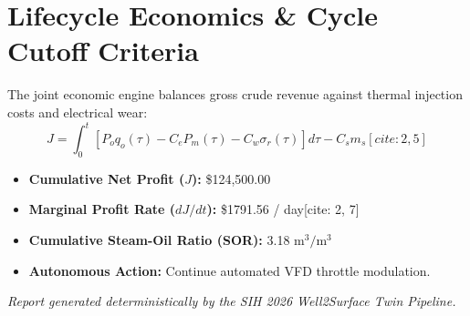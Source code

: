 \documentclass[10pt,a4paper]{article}
\begin{document}
\section{Lifecycle Economics \& Cycle Cutoff Criteria}
The joint economic engine balances gross crude revenue against thermal injection costs and electrical wear:
\begin{equation*}
J = \int_{0}^{t} \left[ P_{o} q_{o}(\tau) - C_{e} P_{m}(\tau) - C_{w} \sigma_{r}(\tau) \right] d\tau - C_{s} m_{s}[cite: 2, 5]
\end{equation*}

\begin{itemize}
  \item \textbf{Cumulative Net Profit ($J$):} \$124,500.00
  \item \textbf{Marginal Profit Rate ($dJ/dt$):} \$1791.56 / day[cite: 2, 7]
  \item \textbf{Cumulative Steam-Oil Ratio (SOR):} 3.18 $\text{m}^3/\text{m}^3$
  \item \textbf{Autonomous Action:} Continue automated VFD throttle modulation.
\end{itemize}

\vspace{0.5cm}
\noindent\textit{Report generated deterministically by the SIH 2026 Well2Surface Twin Pipeline.}
\end{document}

